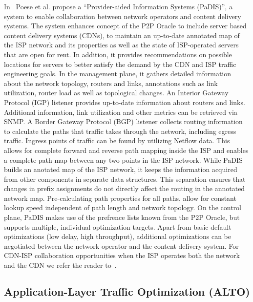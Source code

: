 In~\cite{PADIS2010,PaDIS-IC} Poese et al. propose a ``Provider-aided Information Systems
(PaDIS)'', a system to enable collaboration between network operators and
content delivery systems. The system enhances concept of the P2P Oracle to
include server based content delivery systems (\eg CDNs), to maintain an
up-to-date annotated map of the ISP network and its properties as well as the
state of ISP-operated servers that are open for rent. In addition, it provides
recommendations on possible locations for servers to better satisfy the demand
by the CDN and ISP traffic engineering goals.  In the management plane, it
gathers detailed information about the network topology, \ie routers and links,
annotations such as link utilization, router load as well as topological
changes. An Interior Gateway Protocol (IGP) listener provides up-to-date
information about routers and links.  Additional information, \eg link
utilization and other metrics can be retrieved via SNMP. A Border Gateway
Protocol (BGP) listener collects routing information to calculate the paths
that traffic takes through the network, including egress traffic. Ingress
points of traffic can be found by utilizing Netflow data. This allows for
complete forward and reverse path mapping inside the ISP and enables a complete
path map between any two points in the ISP network.  While PaDIS builds an
anotated map of the ISP network, it keeps the information acquired from other
components in separate data structures. This separation ensures that changes in
prefix assignments do not directly affect the routing in the annotated network
map.  Pre-calculating path properties for all paths, allow for constant lookup
speed independent of path length and network topology. On the control plane,
PaDIS makes use of the prefrence lists known from the P2P Oracle, but supports
multiple, individual optimization targets. Apart from basic default
optimizations (\eg low delay, high throughput), additional optimizations can be
negotiated between the network operator and the content delivery system.
For CDN-ISP collaboration opportunities when the ISP operates both the network and the CDN we
refer the reader to~\cite{CooperativeISPCDN,TECDN,N-CDN,CTTE2010}.

\subsection{Application-Layer Traffic Optimization (ALTO)}\label{sec:ALTO}

